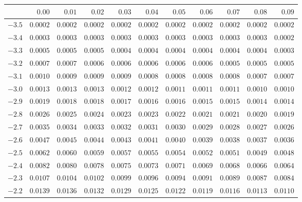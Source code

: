 \documentclass[
  11pt,
  a4paper,
  krantz2]{krantz}
\begin{document}
\begin{table}
\centering\begingroup\fontsize{9}{11}\selectfont

\begin{tabular}{lrrrrrrrrrr}
\toprule
  & $ 0.00 $ & $ 0.01 $ & $ 0.02 $ & $ 0.03 $ & $ 0.04 $ & $ 0.05 $ & $ 0.06 $ & $ 0.07 $ & $ 0.08 $ & $ 0.09 $\\
\midrule
$ -3.5 $ & $0.0002$ & $0.0002$ & $0.0002$ & $0.0002$ & $0.0002$ & $0.0002$ & $0.0002$ & $0.0002$ & $0.0002$ & $0.0002$\\
$ -3.4 $ & $0.0003$ & $0.0003$ & $0.0003$ & $0.0003$ & $0.0003$ & $0.0003$ & $0.0003$ & $0.0003$ & $0.0003$ & $0.0002$\\
$ -3.3 $ & $0.0005$ & $0.0005$ & $0.0005$ & $0.0004$ & $0.0004$ & $0.0004$ & $0.0004$ & $0.0004$ & $0.0004$ & $0.0003$\\
$ -3.2 $ & $0.0007$ & $0.0007$ & $0.0006$ & $0.0006$ & $0.0006$ & $0.0006$ & $0.0006$ & $0.0005$ & $0.0005$ & $0.0005$\\
$ -3.1 $ & $0.0010$ & $0.0009$ & $0.0009$ & $0.0009$ & $0.0008$ & $0.0008$ & $0.0008$ & $0.0008$ & $0.0007$ & $0.0007$\\
\vspace{3pt}
$ -3.0 $ & $0.0013$ & $0.0013$ & $0.0013$ & $0.0012$ & $0.0012$ & $0.0011$ & $0.0011$ & $0.0011$ & $0.0010$ & $0.0010$\\
$ -2.9 $ & $0.0019$ & $0.0018$ & $0.0018$ & $0.0017$ & $0.0016$ & $0.0016$ & $0.0015$ & $0.0015$ & $0.0014$ & $0.0014$\\
$ -2.8 $ & $0.0026$ & $0.0025$ & $0.0024$ & $0.0023$ & $0.0023$ & $0.0022$ & $0.0021$ & $0.0021$ & $0.0020$ & $0.0019$\\
$ -2.7 $ & $0.0035$ & $0.0034$ & $0.0033$ & $0.0032$ & $0.0031$ & $0.0030$ & $0.0029$ & $0.0028$ & $0.0027$ & $0.0026$\\
$ -2.6 $ & $0.0047$ & $0.0045$ & $0.0044$ & $0.0043$ & $0.0041$ & $0.0040$ & $0.0039$ & $0.0038$ & $0.0037$ & $0.0036$\\
\vspace{3pt}
$ -2.5 $ & $0.0062$ & $0.0060$ & $0.0059$ & $0.0057$ & $0.0055$ & $0.0054$ & $0.0052$ & $0.0051$ & $0.0049$ & $0.0048$\\
$ -2.4 $ & $0.0082$ & $0.0080$ & $0.0078$ & $0.0075$ & $0.0073$ & $0.0071$ & $0.0069$ & $0.0068$ & $0.0066$ & $0.0064$\\
$ -2.3 $ & $0.0107$ & $0.0104$ & $0.0102$ & $0.0099$ & $0.0096$ & $0.0094$ & $0.0091$ & $0.0089$ & $0.0087$ & $0.0084$\\
$ -2.2 $ & $0.0139$ & $0.0136$ & $0.0132$ & $0.0129$ & $0.0125$ & $0.0122$ & $0.0119$ & $0.0116$ & $0.0113$ & $0.0110$\\

\end{tabular}
\end{table}
\end{document}
